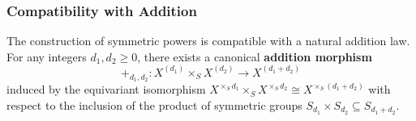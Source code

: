 

%
%
\subsubsection*{Compatibility with Addition}
The construction of symmetric powers is compatible with a natural addition law.
For any integers $d_1, d_2 \geq 0$, there exists a canonical \textbf{addition morphism}
\[ +_{d_1, d_2}: X^{(d_1)} \times_S X^{(d_2)} \to X^{(d_1+d_2)} \]
induced by the equivariant isomorphism $X^{\times_S d_1} \times_S X^{\times_S d_2} \cong X^{\times_S (d_1+d_2)}$ with respect to the inclusion of the product of symmetric groups $S_{d_1} \times S_{d_2} \subseteq S_{d_1+d_2}$.

